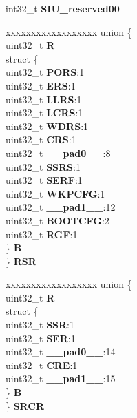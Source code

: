\begin{DoxyCompactItemize}
\begin{tabbing}
\end{tabbing}\item 
\mbox{\label{structSIU__tag_af7a6551257a150e5894aa17546a3c76f}} 
int32\+\_\+t {\bfseries S\+I\+U\+\_\+reserved00}
\item 
\mbox{\label{structSIU__tag_a3cfd8e55d6161761336da4cfce043817}} 
\begin{tabbing}
xx\=xx\=xx\=xx\=xx\=xx\=xx\=xx\=xx\=\kill
union \{\\
\>uint32\_t {\bfseries R}\\
\>struct \{\\
\>\>uint32\_t {\bfseries PORS}:1\\
\>\>uint32\_t {\bfseries ERS}:1\\
\>\>uint32\_t {\bfseries LLRS}:1\\
\>\>uint32\_t {\bfseries LCRS}:1\\
\>\>uint32\_t {\bfseries WDRS}:1\\
\>\>uint32\_t {\bfseries CRS}:1\\
\>\>uint32\_t {\bfseries \_\_pad0\_\_}:8\\
\>\>uint32\_t {\bfseries SSRS}:1\\
\>\>uint32\_t {\bfseries SERF}:1\\
\>\>uint32\_t {\bfseries WKPCFG}:1\\
\>\>uint32\_t {\bfseries \_\_pad1\_\_}:12\\
\>\>uint32\_t {\bfseries BOOTCFG}:2\\
\>\>uint32\_t {\bfseries RGF}:1\\
\>\} {\bfseries B}\\
\} {\bfseries RSR}\\

\end{tabbing}\item 
\mbox{\label{structSIU__tag_a234e5cca5953d6c2a8437da4f0a81f37}} 
\begin{tabbing}
xx\=xx\=xx\=xx\=xx\=xx\=xx\=xx\=xx\=\kill
union \{\\
\>uint32\_t {\bfseries R}\\
\>struct \{\\
\>\>uint32\_t {\bfseries SSR}:1\\
\>\>uint32\_t {\bfseries SER}:1\\
\>\>uint32\_t {\bfseries \_\_pad0\_\_}:14\\
\>\>uint32\_t {\bfseries CRE}:1\\
\>\>uint32\_t {\bfseries \_\_pad1\_\_}:15\\
\>\} {\bfseries B}\\
\} {\bfseries SRCR}\\


\end{tabbing}
\end{DoxyCompactItemize}
